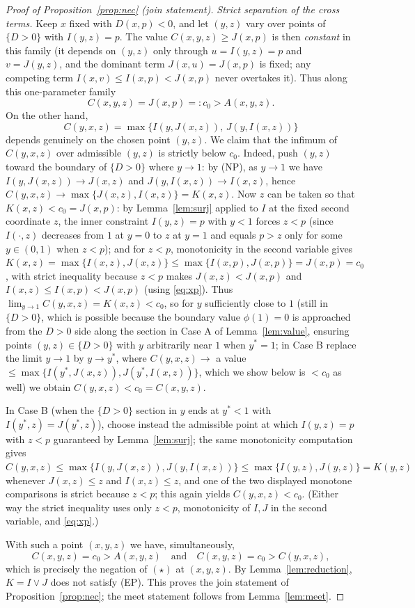 \documentclass{amsart}
\theoremstyle{plain}
\theoremstyle{definition}
\begin{document}
\begin{proof}[Proof of Proposition~\ref{prop:nec} (join statement)]
\smallskip\noindent\emph{Strict separation of the cross terms.}
Keep $x$ fixed with $D(x,p)<0$, and let $(y,z)$ vary over points of $\{D>0\}$ with
$I(y,z)=p$. The value $C(x,y,z)\ge J(x,p)$ is then \emph{constant} in this family (it
depends on $(y,z)$ only through $u=I(y,z)=p$ and $v=J(y,z)$, and the dominant term
$J(x,u)=J(x,p)$ is fixed; any competing term $I(x,v)\le I(x,p)<J(x,p)$ never overtakes it).
Thus along this one-parameter family
\begin{equation}\label{eq:Cconst}
C(x,y,z)=J(x,p)=:c_0>A(x,y,z).
\end{equation}
On the other hand,
\[
C(y,x,z)=\max\{I(y,J(x,z)),\,J(y,I(x,z))\}
\]
depends genuinely on the chosen point $(y,z)$. We claim that the infimum of $C(y,x,z)$
over admissible $(y,z)$ is strictly below $c_0$. Indeed, push $(y,z)$ toward the boundary
of $\{D>0\}$ where $y\to1$: by (NP), as $y\to1$ we have $I(y,J(x,z))\to J(x,z)$ and
$J(y,I(x,z))\to I(x,z)$, hence $C(y,x,z)\to\max\{J(x,z),I(x,z)\}=K(x,z)$. Now $z$ can be
taken so that $K(x,z)<c_0=J(x,p)$: by Lemma~\ref{lem:surj} applied to $I$ at the fixed
second coordinate $z$, the inner constraint $I(y,z)=p$ with $y<1$ forces $z<p$ (since
$I(\cdot,z)$ decreases from $1$ at $y=0$ to $z$ at $y=1$ and equals $p>z$ only for some
$y\in(0,1)$ when $z<p$); and for $z<p$, monotonicity in the second variable gives
$K(x,z)=\max\{I(x,z),J(x,z)\}\le\max\{I(x,p),J(x,p)\}=J(x,p)=c_0$, with strict inequality
because $z<p$ makes $J(x,z)<J(x,p)$ and $I(x,z)\le I(x,p)<J(x,p)$ (using \eqref{eq:xp}).
Thus $\lim_{y\to1}C(y,x,z)=K(x,z)<c_0$, so for $y$ sufficiently close to $1$ (still in
$\{D>0\}$, which is possible because the boundary value $\phi(1)=0$ is approached from the
$D>0$ side along the section in Case A of Lemma~\ref{lem:value}, ensuring points
$(y,z)\in\{D>0\}$ with $y$ arbitrarily near $1$ when $y^\ast=1$; in Case B replace the
limit $y\to1$ by $y\to y^\ast$, where $C(y,x,z)\to$ a value
$\le\max\{I(y^\ast,J(x,z)),J(y^\ast,I(x,z))\}$, which we show below is $<c_0$ as well) we
obtain $C(y,x,z)<c_0=C(x,y,z)$.

In Case B (when the $\{D>0\}$ section in $y$ ends at $y^\ast<1$ with
$I(y^\ast,z)=J(y^\ast,z)$), choose instead the admissible point at which $I(y,z)=p$ with
$z<p$ guaranteed by Lemma~\ref{lem:surj}; the same monotonicity computation gives
$C(y,x,z)\le\max\{I(y,J(x,z)),J(y,I(x,z))\}\le\max\{I(y,z),J(y,z)\}=K(y,z)$ whenever
$J(x,z)\le z$ and $I(x,z)\le z$, and one of the two displayed monotone comparisons is
strict because $z<p$; this again yields $C(y,x,z)<c_0$. (Either way the strict inequality
uses only $z<p$, monotonicity of $I,J$ in the second variable, and \eqref{eq:xp}.)

\smallskip
With such a point $(x,y,z)$ we have, simultaneously,
\[
C(x,y,z)=c_0>A(x,y,z)\quad\text{and}\quad C(x,y,z)=c_0>C(y,x,z),
\]
which is precisely the negation of $(\star)$ at $(x,y,z)$. By Lemma~\ref{lem:reduction},
$K=I\vee J$ does not satisfy (EP). This proves the join statement of
Proposition~\ref{prop:nec}; the meet statement follows from Lemma~\ref{lem:meet}.
\end{proof}
\end{document}
